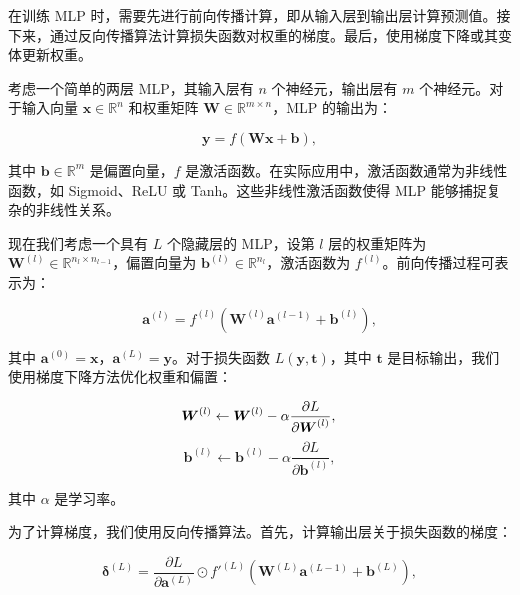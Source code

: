 在训练 MLP 时，需要先进行前向传播计算，即从输入层到输出层计算预测值。接下来，通过反向传播算法计算损失函数对权重的梯度。最后，使用梯度下降或其变体更新权重。

考虑一个简单的两层 MLP，其输入层有 $n$ 个神经元，输出层有 $m$ 个神经元。对于输入向量 $\boldsymbol{x} \in \mathbb{R}^{n}$ 和权重矩阵 $\boldsymbol{W} \in \mathbb{R}^{m \times n}$，MLP 的输出为：

\begin{equation}
\boldsymbol{y} = f(\boldsymbol{W}\boldsymbol{x} + \boldsymbol{b}),
\end{equation}

其中 $\boldsymbol{b} \in \mathbb{R}^{m}$ 是偏置向量，$f$ 是激活函数。在实际应用中，激活函数通常为非线性函数，如 Sigmoid、ReLU 或 Tanh。这些非线性激活函数使得 MLP 能够捕捉复杂的非线性关系。

现在我们考虑一个具有 $L$ 个隐藏层的 MLP，设第 $l$ 层的权重矩阵为 $\boldsymbol{W}^{(l)} \in \mathbb{R}^{n_l \times n_{l-1}}$，偏置向量为 $\boldsymbol{b}^{(l)} \in \mathbb{R}^{n_l}$，激活函数为 $f^{(l)}$。前向传播过程可表示为：

\begin{equation}
\boldsymbol{a}^{(l)} = f^{(l)}(\boldsymbol{W}^{(l)}\boldsymbol{a}^{(l-1)} + \boldsymbol{b}^{(l)}),
\end{equation}

其中 $\boldsymbol{a}^{(0)} = \boldsymbol{x}$，$\boldsymbol{a}^{(L)} = \boldsymbol{y}$。对于损失函数 $L(\boldsymbol{y}, \boldsymbol{t})$，其中 $\boldsymbol{t}$ 是目标输出，我们使用梯度下降方法优化权重和偏置：

\begin{equation}
\boldsymbol{W}^{(l)} \leftarrow \boldsymbol{W}^{(l)} - \alpha \frac{\partial L}{\partial \boldsymbol{W}^{(l)}}, \\
\end{equation}
\begin{equation}
\boldsymbol{b}^{(l)} \leftarrow \boldsymbol{b}^{(l)} - \alpha \frac{\partial L}{\partial \boldsymbol{b}^{(l)}},
\end{equation}

其中 $\alpha$ 是学习率。

为了计算梯度，我们使用反向传播算法。首先，计算输出层关于损失函数的梯度：

\begin{equation}
\boldsymbol{\delta}^{(L)} = \frac{\partial L}{\partial \boldsymbol{a}^{(L)}} \odot f'^{(L)}(\boldsymbol{W}^{(L)}\boldsymbol{a}^{(L-1)} + \boldsymbol{b}^{(L)}),
\end{equation}


